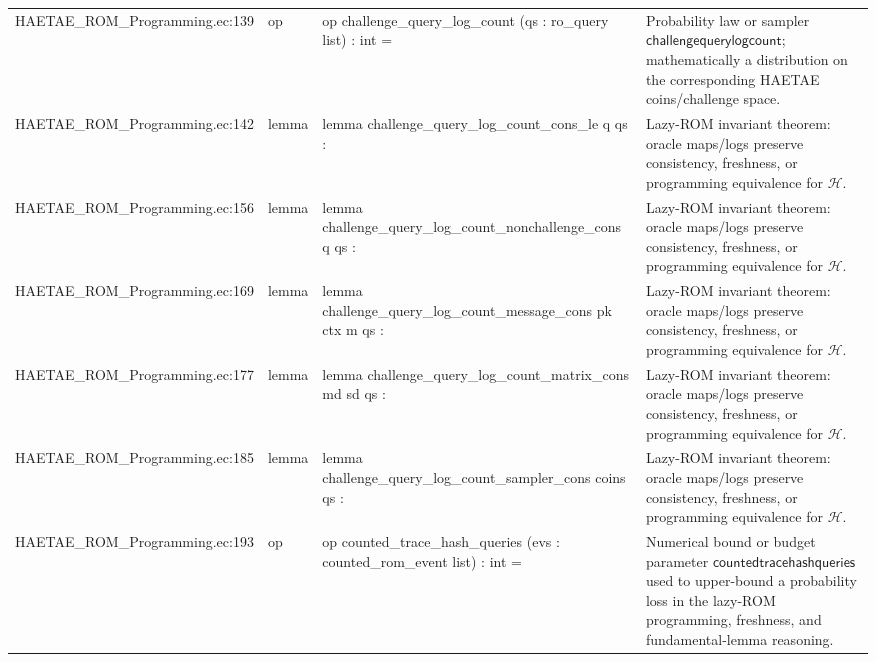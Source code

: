 \documentclass[10pt]{article}
\begin{document}
\begin{longtable}{L{0.11\textwidth}L{0.055\textwidth}L{0.385\textwidth}L{0.41\textwidth}}
HAETAE\_\allowbreak{}ROM\_\allowbreak{}Programming.\allowbreak{}ec:\allowbreak{}139 & op & {\ttfamily\scriptsize op challenge\_\allowbreak{}query\_\allowbreak{}log\_\allowbreak{}count (qs : ro\_\allowbreak{}query list) : int =} & Probability law or sampler $\mathsf{challengequerylogcount}$; mathematically a distribution on the corresponding HAETAE coins/challenge space. \\
HAETAE\_\allowbreak{}ROM\_\allowbreak{}Programming.\allowbreak{}ec:\allowbreak{}142 & lemma & {\ttfamily\scriptsize lemma challenge\_\allowbreak{}query\_\allowbreak{}log\_\allowbreak{}count\_\allowbreak{}cons\_\allowbreak{}le q qs :} & Lazy-ROM invariant theorem: oracle maps/logs preserve consistency, freshness, or programming equivalence for $\mathcal H$. \\
HAETAE\_\allowbreak{}ROM\_\allowbreak{}Programming.\allowbreak{}ec:\allowbreak{}156 & lemma & {\ttfamily\scriptsize lemma challenge\_\allowbreak{}query\_\allowbreak{}log\_\allowbreak{}count\_\allowbreak{}nonchallenge\_\allowbreak{}cons q qs :} & Lazy-ROM invariant theorem: oracle maps/logs preserve consistency, freshness, or programming equivalence for $\mathcal H$. \\
HAETAE\_\allowbreak{}ROM\_\allowbreak{}Programming.\allowbreak{}ec:\allowbreak{}169 & lemma & {\ttfamily\scriptsize lemma challenge\_\allowbreak{}query\_\allowbreak{}log\_\allowbreak{}count\_\allowbreak{}message\_\allowbreak{}cons pk ctx m qs :} & Lazy-ROM invariant theorem: oracle maps/logs preserve consistency, freshness, or programming equivalence for $\mathcal H$. \\
HAETAE\_\allowbreak{}ROM\_\allowbreak{}Programming.\allowbreak{}ec:\allowbreak{}177 & lemma & {\ttfamily\scriptsize lemma challenge\_\allowbreak{}query\_\allowbreak{}log\_\allowbreak{}count\_\allowbreak{}matrix\_\allowbreak{}cons md sd qs :} & Lazy-ROM invariant theorem: oracle maps/logs preserve consistency, freshness, or programming equivalence for $\mathcal H$. \\
HAETAE\_\allowbreak{}ROM\_\allowbreak{}Programming.\allowbreak{}ec:\allowbreak{}185 & lemma & {\ttfamily\scriptsize lemma challenge\_\allowbreak{}query\_\allowbreak{}log\_\allowbreak{}count\_\allowbreak{}sampler\_\allowbreak{}cons coins qs :} & Lazy-ROM invariant theorem: oracle maps/logs preserve consistency, freshness, or programming equivalence for $\mathcal H$. \\
HAETAE\_\allowbreak{}ROM\_\allowbreak{}Programming.\allowbreak{}ec:\allowbreak{}193 & op & {\ttfamily\scriptsize op counted\_\allowbreak{}trace\_\allowbreak{}hash\_\allowbreak{}queries (evs : counted\_\allowbreak{}rom\_\allowbreak{}event list) : int =} & Numerical bound or budget parameter $\mathsf{countedtracehashqueries}$ used to upper-bound a probability loss in the lazy-ROM programming, freshness, and fundamental-lemma reasoning. \\

\end{longtable}
\end{document}
